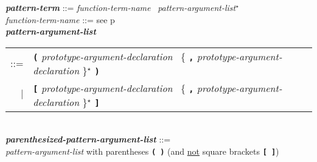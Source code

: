 \documentclass[12pt]{article}
\newcommand{\TT}[1]{{\tt \bfseries #1}}
\newcommand{\STAR}{{\Large $^\star$}}
\newcommand{\emkey}[1]{{\em \bfseries #1}}
\newcommand{\pagref}[1]{p\pageref{#1}}
\newenvironment{indpar}[1][0.3in]%
	{\begin{list}{}%
		     {\setlength{\itemsep}{0in}%
		      \setlength{\topsep}{0in}%
		      \setlength{\parsep}{1ex}%
		      \setlength{\labelwidth}{#1}%
		      \setlength{\leftmargin}{#1}%
		      \addtolength{\leftmargin}{\labelsep}}%
	 \item}%
	{\end{list}}
\begin{document}
\begin{indpar}[0.1in]
\emkey{pattern-term}\label{PATTERN-TERM}
    ::= {\em function-term-name}~ {\em pattern-argument-list}\STAR{}
\\[0.5ex]
{\em function-term-name} ::= see \pagref{FUNCTION-TERM-NAME}
\\[0.5ex]
\emkey{pattern-argument-list}\label{PATTERN-ARGUMENT-LIST} \\
\hspace*{0.5in}
    \begin{tabular}[t]{@{}rl}
    ::= & \TT{(} {\em prototype-argument-declaration}~
	     \{ \TT{,} {\em prototype-argument-declaration} \}\STAR{} \TT{)} \\
    $|$ & \TT{[} {\em prototype-argument-declaration}~
	     \{ \TT{,} {\em prototype-argument-declaration} \}\STAR{} \TT{]} \\
    \end{tabular}
\\[0.5ex]
\emkey{parenthesized-pattern-argument-list}%
    \label{PARENTHESIZED-PATTERN-ARGUMENT-LIST} ::= \\
\hspace*{0.5in}
    {\em pattern-argument-list} with parentheses \TT{(~)}
    (and \underline{not} square brackets \TT{[~]})
\end{indpar}
\end{document}
